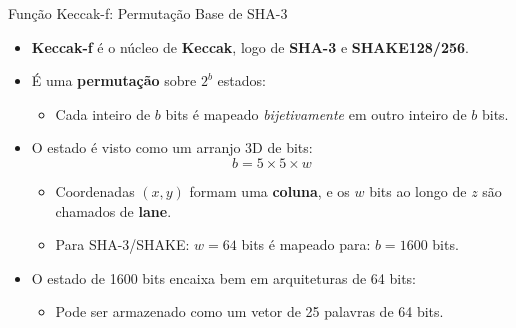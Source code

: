 \documentclass{beamer}
\begin{document}
\begin{frame}{Função Keccak-f: Permutação Base de SHA-3}
  \begin{itemize}
    \item \textbf{Keccak-f} é o núcleo de \textbf{Keccak}, logo de \textbf{SHA-3} e \textbf{SHAKE128/256}.
    \item É uma \textbf{permutação} sobre $2^b$ estados:
      \begin{itemize}
        \item Cada inteiro de $b$ bits é mapeado \emph{bijetivamente} em outro inteiro de $b$ bits.
      \end{itemize}
    \item O estado é visto como um arranjo 3D de bits:
      \[
        b = 5 \times 5 \times w
      \]
      \begin{itemize}
        \item Coordenadas $(x,y)$ formam uma \textbf{coluna}, e os $w$ bits ao longo de $z$ são chamados de \textbf{lane}.
        \item Para SHA-3/SHAKE: $w = 64$ bits é mapeado para: $b = 1600$ bits.
      \end{itemize}
    \item O estado de 1600 bits encaixa bem em arquiteturas de 64 bits:
      \begin{itemize}
        \item Pode ser armazenado como um vetor de 25 palavras de 64 bits.
      \end{itemize}
  \end{itemize}
\end{frame}
\end{document}
